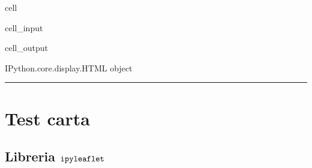 \documentclass[letterpaper,10pt,italian]{jupyterBook}
\begin{document}
\begin{sphinxuseclass}{cell}\begin{sphinxVerbatimInput}

\begin{sphinxuseclass}{cell_input}
\begin{sphinxVerbatim}[commandchars=\\\{\}]
   
\end{sphinxVerbatim}

\end{sphinxuseclass}\end{sphinxVerbatimInput}
\begin{sphinxVerbatimOutput}

\begin{sphinxuseclass}{cell_output}
\begin{sphinxVerbatim}[commandchars=\\\{\}]
\PYGZlt{}IPython.core.display.HTML object\PYGZgt{}
\end{sphinxVerbatim}

\end{sphinxuseclass}\end{sphinxVerbatimOutput}

\end{sphinxuseclass}

\bigskip\hrule\bigskip


\sphinxstepscope


\chapter{Test carta}
\label{\detokenize{ch/history-test:test-carta}}\label{\detokenize{ch/history-test::doc}}

\section{Libreria \protect\(\texttt{ipyleaflet}\protect\)}
\label{\detokenize{ch/history-test:libreria-texttt-ipyleaflet}}
\end{document}
